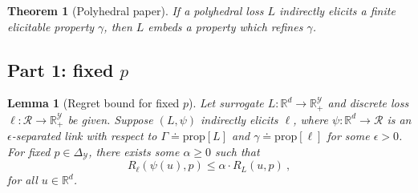 \documentclass[12pt]{article}
\newcommand{\reals}{\mathbb{R}}
\newcommand{\defeq}{\doteq}%
\newcommand{\prop}[1]{\mathrm{prop}[#1]}
\newcommand{\simplex}{\Delta_\Y}
\newcommand{\R}{\mathcal{R}}
\newcommand{\Y}{\mathcal{Y}}
\newcommand{\risk}[1]{\underline{#1}}
\newcommand{\inprod}[2]{\langle #1, #2 \rangle}%
\newcommand{\regret}[3]{R_{#1}(#2,#3)}
\newtheorem{theorem}{Theorem}
\newtheorem{lemma}{Lemma}
\begin{document}
\begin{theorem}[Polyhedral paper]
  \label{thm:poly-embed-refine}
  If a polyhedral loss $L$ indirectly elicits a finite elicitable property $\gamma$, then $L$ embeds a property which refines $\gamma$.
\end{theorem}

\subsection{Part 1: fixed $p$}

\begin{lemma}[Regret bound for fixed $p$]
  \label{lem:regret-bound-fixed-p}
  Let surrogate $L:\reals^d \to \reals^\Y_+$ and discrete loss $\ell:\R\to\reals^\Y_+$ be given.
  Suppose $(L,\psi)$ indirectly elicits $\ell$, where $\psi:\reals^d\to\R$ is an $\epsilon$-separated link with respect to $\Gamma \defeq \prop{L}$ and $\gamma \defeq \prop{\ell}$ for some $\epsilon>0$.
  For fixed $p\in\simplex$, there exists some $\alpha\geq 0$ such that
  \begin{equation}
    \label{eq:surrogate-regret-bound-fixed}
    \regret{\ell}{\psi(u)}{p}
    \leq
    \alpha \cdot \regret{L}{u}{p}~,
  \end{equation}
  for all $u\in\reals^d$.
\end{lemma}
\end{document}
